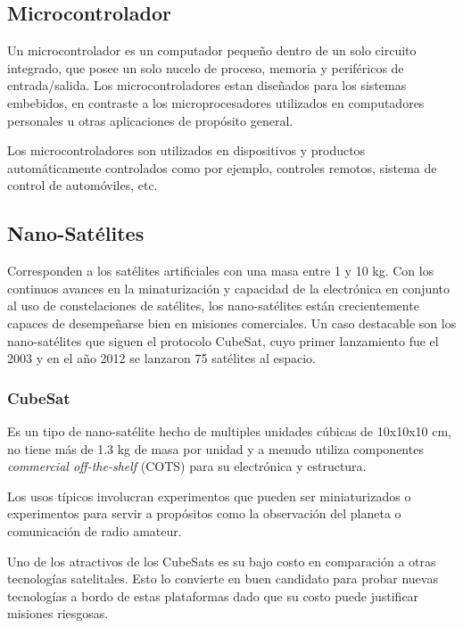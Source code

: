 \documentclass[11pt,letterpaper]{article}
\begin{document}
\subsection{Microcontrolador}
Un microcontrolador es un computador pequeño dentro de un solo circuito integrado, que posee un solo nucelo de proceso, memoria y perif\'ericos de entrada/salida. Los microcontroladores estan diseñados para los sistemas embebidos, en contraste a los microprocesadores utilizados en computadores personales u otras aplicaciones de propósito general.

Los microcontroladores son utilizados en dispositivos y productos automáticamente controlados como por ejemplo, controles remotos, sistema de control de automóviles, etc.

\subsection{Nano-Sat\'elites}
Corresponden a los sat\'elites artificiales con una masa entre 1 y 10 kg. Con los continuos avances en la minaturización y capacidad de la electrónica en conjunto al uso de constelaciones de sat\'elites, los nano-sat\'elites están crecientemente capaces de desempeñarse bien en misiones comerciales. Un caso destacable son los nano-sat\'elites que siguen el protocolo CubeSat, cuyo primer lanzamiento fue el 2003 y en el año 2012 se lanzaron 75 sat\'elites al espacio.

\subsubsection{CubeSat}
Es un tipo de nano-sat\'elite hecho de multiples unidades cúbicas de 10x10x10 cm, no tiene más de 1.3 kg de masa por unidad y a menudo utiliza componentes \textit{commercial off-the-shelf} (COTS) para su electrónica y estructura.

Los usos típicos involucran experimentos que pueden ser miniaturizados o experimentos para servir a propósitos como la observación del planeta o comunicación de radio amateur.

Uno de los atractivos de los CubeSats es su bajo costo en comparación a otras tecnologías satelitales. Esto lo convierte en buen candidato para probar nuevas tecnologías a bordo de estas plataformas dado que su costo puede justificar misiones riesgosas.
\end{document}
